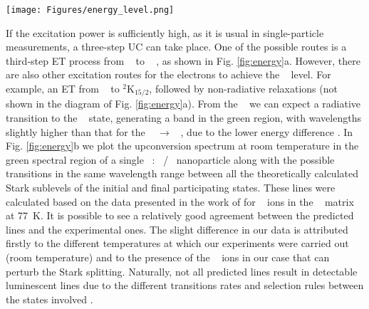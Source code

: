 \documentclass[journal=jacsat,manuscript=article, layout=twocolumn]{achemso}
\newcommand*\Yttria[1]{Y$_{2}$O$_{3}$}
\newcommand*\Yb[1]{Yb$^{3+}$}
\newcommand*\Er[1]{Er$^{3+}$}
\newcommand*\twoHnine[1]{$^2$H$_{9/2}$}
\newcommand*\fourSthree[1]{$^4$S$_{3/2}$}
\newcommand*\fourFnine[1]{$^4$F$_{9/2}$}
\newcommand*\fourIthirteen[1]{$^4$I$_{13/2}$}
\newcommand*\fourIfifteen[1]{$^4$I$_{15/2}$}
\begin{document}
\begin{figure*}[h!]
\begin{center}
\texttt{[image: Figures/energy\_level.png]}
\caption{a) Partial energy level diagram of the \Er~ ions and photophysical dynamics on UC scheme. Solid upwards arrows represent energy transfer from \Yb~ ions (not shown); Curly arrows represent non-radiative relaxation; Solid downwards arrows represent radiative decays. Energy levels in scale. b) UC spectra of a single particle in the green spectral region along with the predicted lines. Red and black vertical lines represent three and two-photon transitions, respectively. c) UC spectra under the higher excitation irradiance (\SI{e7}{\watt\per\square\centi\meter} - red curve) and the lower excitation irradiance (\SI{e4}{\watt\per\square\centi\meter} - black curve). The dashed vertical lines represent the spectral position of non-overlapped peaks. d) Power-law behaviour for the spectral intensity at \SI{549}{\nano\meter} (blue dots) and \SI{573}{\nano\meter} (orange dots). e) Same power-law data showing the highest powers used in the algorithm. The intensity was re-scaled in the y-axis for better visualization of the different slopes.}
\label{fig:energy}
\end{center}
\end{figure*}

If the excitation power is sufficiently high, as it is usual in single-particle measurements, a three-step UC can take place. One of the possible routes is a third-step ET process from \fourFnine~ to \twoHnine~ \cite{Ruhl_2021}, as shown in Fig. \ref{fig:energy}a. However, there are also other excitation routes for the electrons to achieve the \twoHnine~ level. For example, an ET from \fourSthree~ to $^2$K$_{15/2}$, followed by non-radiative relaxations \cite{Berry_2015} (not shown in the diagram of Fig. \ref{fig:energy}a). From the \twoHnine~ we can expect a radiative transition to the \fourIthirteen~ state, generating a band in the green region, with wavelengths slightly higher than that for the \fourSthree~ $\rightarrow$ \fourIfifteen~, due to the lower energy difference \cite{Kisliuk_1964}. In Fig. \ref{fig:energy}b we plot the upconversion spectrum at room temperature in the green spectral region of a single \Yttria~: \Yb~/\Er~ nanoparticle along with the possible transitions in the same wavelength range between all the theoretically calculated Stark sublevels of the initial and final participating states. These lines were calculated based on the data presented in the work of \citeauthor{Kisliuk_1964} \cite{Kisliuk_1964} for \Er~ ions in the \Yttria~ matrix at \SI{77}{\kelvin}. It is possible to see a relatively good agreement between the predicted lines and the experimental ones. The slight difference in our data is attributed firstly to the different temperatures at which our experiments were carried out (room temperature) and to the presence of the \Yb~ ions in our case that can perturb the Stark splitting. Naturally, not all predicted lines result in detectable luminescent lines due to the different transitions rates and selection rules between the states involved \cite{Brik_2020}.
\end{document}
